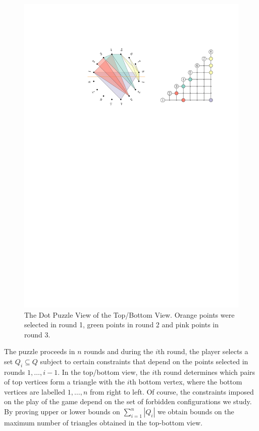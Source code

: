 \documentclass{patmorin}
\begin{document}
\begin{figure}
   \begin{center}
      \includegraphics{figs/point-view}
   \end{center}
   \caption{The Dot Puzzle View of the Top/Bottom View. Orange points were
     selected in round 1, green points in round 2 and pink points in round 3.}
\end{figure}

The puzzle proceeds in $n$ rounds and during the $i$th round, the player
selects a set $Q_i\subseteq Q$ subject to certain constraints that depend
on the points selected in rounds $1,\ldots,i-1$.  In the top/bottom view,
the $i$th round determines which pairs of top vertices form a triangle
with the $i$th bottom vertex, where the bottom vertices are labelled
$1,\ldots,n$ from right to left.
Of course, the constraints imposed on the play of the game depend on
the set of forbidden configurations we study.  By proving upper or lower bounds on $\sum_{i=1}^n |Q_i|$ we obtain bounds on the maximum number of triangles obtained in the top-bottom view.
\end{document}
